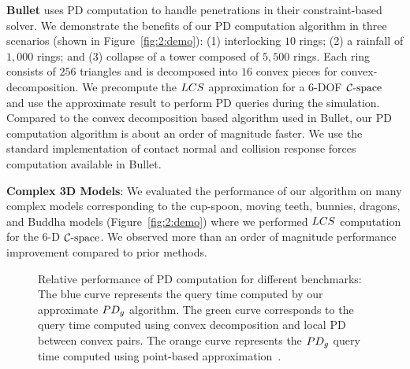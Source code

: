 \textbf{Bullet} uses PD computation to handle penetrations in their constraint-based solver.
We demonstrate the benefits of our PD computation algorithm in three scenarios (shown in Figure~\ref{fig:2:demo}):
(1) interlocking $10$ rings; (2) a rainfall of $1,000$ rings; and (3) collapse of a tower composed of $5,500$ rings.
Each ring consists of $256$ triangles and is decomposed into $16$ convex pieces for convex-decomposition.
We precompute the $LCS$ approximation for a 6-DOF $\mathcal C\text{-space}$ and use the approximate result to perform PD queries during the simulation.
Compared to the convex decomposition based algorithm used in Bullet, our PD computation algorithm is about
an order of magnitude faster. We use the standard implementation of contact normal and collision response forces computation available in Bullet.

\textbf{Complex 3D Models}:
We evaluated the performance of our algorithm on many complex models corresponding to the cup-spoon, moving teeth, bunnies, dragons, and Buddha models (Figure~\ref{fig:2:demo}) where we performed $LCS$ computation for the 6-D $\mathcal C\text{-space}$. We observed more than an order of magnitude performance improvement compared to prior methods.


\begin{figure}[t]
  \centering
    \hspace{0.05em}
  \caption[Relative performance of PD computation for different benchmarks]{Relative performance of PD computation for different benchmarks: The blue curve represents the query time computed by our approximate $PD_g$ algorithm. The green curve corresponds to the query time computed using convex decomposition and local PD between convex pairs. The orange curve represents the $PD_g$ query time computed using point-based approximation~\protect\cite{Lien:2009:ASM}.}\label{fig:2:performancecomparison}
\end{figure}





